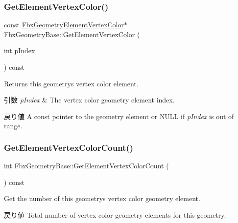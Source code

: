 \subsubsection{\texorpdfstring{Get\+Element\+Vertex\+Color()}{GetElementVertexColor()}\hspace{0.1cm}{\footnotesize\ttfamily [2/2]}}
{\footnotesize\ttfamily const \hyperlink{fbxlayer_8h_a4baddeaf720350758d230973d114f593}{Fbx\+Geometry\+Element\+Vertex\+Color}$\ast$ Fbx\+Geometry\+Base\+::\+Get\+Element\+Vertex\+Color (\begin{DoxyParamCaption}\item[{int}]{p\+Index = {} }\end{DoxyParamCaption}) const}

Returns this geometry\textquotesingle{}s vertex color element. 
\begin{DoxyParams}{引数}
{\em p\+Index} & The vertex color geometry element index. \\
\hline
\end{DoxyParams}
\begin{DoxyReturn}{戻り値}
A const pointer to the geometry element or {\ttfamily N\+U\+LL} if {\itshape p\+Index} is out of range. 
\end{DoxyReturn}
\mbox{\label{class_fbx_geometry_base_ab0c36aa02e726e017f02802a42705f68}} 
\subsubsection{\texorpdfstring{Get\+Element\+Vertex\+Color\+Count()}{GetElementVertexColorCount()}}
{\footnotesize\ttfamily int Fbx\+Geometry\+Base\+::\+Get\+Element\+Vertex\+Color\+Count (\begin{DoxyParamCaption}{ }\end{DoxyParamCaption}) const}

Get the number of this geometry\textquotesingle{}s vertex color geometry element. \begin{DoxyReturn}{戻り値}
Total number of vertex color geometry elements for this geometry. 
\end{DoxyReturn}
\mbox{\label{class_fbx_geometry_base_a2ba68cd342357a08aceae046aba944d4}} 
